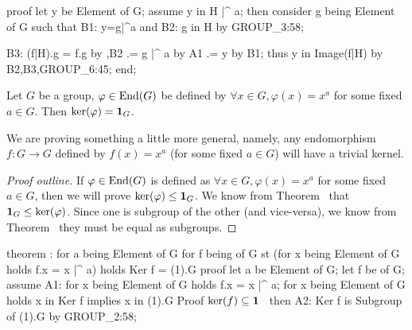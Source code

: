 \nwenddocs{}\endmoddef\nwstartdeflinemarkup{}\nwenddeflinemarkup
proof
  let y be Element of G;
  assume y in H |^ a;
  then consider g being Element of G such that
  B1:    y=g|^a and
  B2:    g in H
  by GROUP_3:58;

  B3: (f|H).g = f.g by ,B2
             .= g |^ a by A1
             .= y by B1;
  thus y in Image(f|H) by B2,B3,GROUP_6:45;
end;
\nwendcode{}\nwdocspar

\begin{theorem}\label{thm:characteristic:inner:ker-of-inner-is-trivial}
Let $G$ be a group, $\varphi\in\operatorname{End}(G)$ be defined by $\forall x\in
G,\varphi(x)=x^{a}$ for some fixed $a\in G$.
Then $\ker(\varphi)=\mathbf{1}_{G}$.
\end{theorem}

We are proving something a little
more general, namely, any endomorphism $f\colon G\to G$ defined by
$f(x)=x^{a}$ (for some fixed $a\in G$) will have a trivial kernel.

\begin{proof}[Proof outline]
If $\varphi\in\operatorname{End}(G)$ is defined as $\forall x\in G,\varphi(x)=x^{a}$
for some fixed $a\in G$, then we will prove
$\ker(\varphi)\leq\mathbf{1}_{G}$. We know from Theorem~%
 that $\mathbf{1}_{G}\leq\ker(\varphi)$.
Since one is subgroup of the other (and vice-versa), we know from
Theorem~ they must be equal as subgroups.
\end{proof}

\nwenddocs{}\endmoddef\nwstartdeflinemarkup{}\nwenddeflinemarkup
theorem :
  for a being Element of G
  for f being  of G
  st (for x being Element of G holds f.x = x |^ a)
  holds Ker f = (1).G
proof
  let a be Element of G;
  let f be  of G;
  assume A1: for x being Element of G holds f.x = x |^ a;
  for x being Element of G holds x in Ker f implies x in (1).G
  \LA{}Proof $\ker(f)\subseteq\mathbf{1}$~{\nwtagstyle{}}\RA{}
  then A2: Ker f is Subgroup of (1).G by GROUP_2:58;

